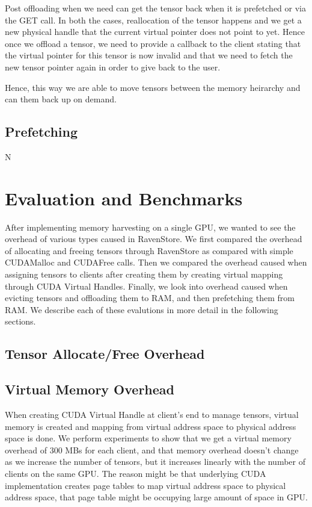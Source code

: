 \documentclass{article}
\begin{document}
Post offloading when we need can get the tensor back when it is prefetched or via the GET call. In both the cases,
reallocation of the tensor happens and we get a new physical handle that the current virtual pointer does not point
to yet. Hence once we offload a tensor, we need to provide a callback to the client stating that the virtual pointer
for this tensor is now invalid and that we need to fetch the new tensor pointer again in order to give back to the user.

Hence, this way we are able to move tensors between the memory heirarchy and can them back up on demand.

\subsection{Prefetching}
N


\section{Evaluation and Benchmarks}
After implementing memory harvesting on a single GPU, we wanted to see the overhead of various types caused in RavenStore.
We first compared the overhead of allocating and freeing tensors through RavenStore as compared with simple CUDAMalloc and CUDAFree
calls. Then we compared the overhead caused when assigning tensors to clients after creating them by creating virtual mapping through CUDA
Virtual Handles. Finally, we look into overhead caused when evicting tensors and offloading them to RAM, and then prefetching them from RAM.
We describe each of these evalutions in more detail in the following sections.

\subsection{Tensor Allocate/Free Overhead}

\subsection{Virtual Memory Overhead}
When creating CUDA Virtual Handle at client's end to manage tensors, virtual memory is created and mapping from
virtual address space to physical address space is done. We perform experiments to show that we get a virtual memory overhead
of 300 MBs for each client, and that memory overhead doesn't change as we increase the number of tensors, but it increases linearly
with the number of clients on the same GPU. The reason might be that underlying CUDA implementation creates page tables to map virtual address space
to physical address space, that page table might be occupying large amount of space in GPU.
\end{document}
